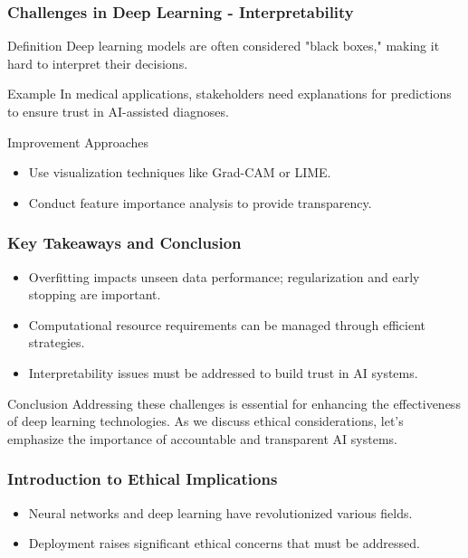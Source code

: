 \documentclass[aspectratio=169]{beamer}
\begin{document}
\begin{frame}[fragile]
    \frametitle{Challenges in Deep Learning - Interpretability}
    \begin{block}{Definition}
        Deep learning models are often considered "black boxes," making it hard to interpret their decisions.
    \end{block}

    \begin{block}{Example}
        In medical applications, stakeholders need explanations for predictions to ensure trust in AI-assisted diagnoses.
    \end{block}

    \begin{block}{Improvement Approaches}
        \begin{itemize}
            \item Use visualization techniques like Grad-CAM or LIME.
            \item Conduct feature importance analysis to provide transparency.
        \end{itemize}
    \end{block}
\end{frame}

\begin{frame}[fragile]
    \frametitle{Key Takeaways and Conclusion}
    \begin{itemize}
        \item Overfitting impacts unseen data performance; regularization and early stopping are important.
        \item Computational resource requirements can be managed through efficient strategies.
        \item Interpretability issues must be addressed to build trust in AI systems.
    \end{itemize}

    \begin{block}{Conclusion}
        Addressing these challenges is essential for enhancing the effectiveness of deep learning technologies. As we discuss ethical considerations, let's emphasize the importance of accountable and transparent AI systems.
    \end{block}
\end{frame}

\begin{frame}[fragile]
    \frametitle{Introduction to Ethical Implications}
    \begin{itemize}
        \item Neural networks and deep learning have revolutionized various fields.
        \item Deployment raises significant ethical concerns that must be addressed.
    \end{itemize}
\end{frame}
\end{document}

